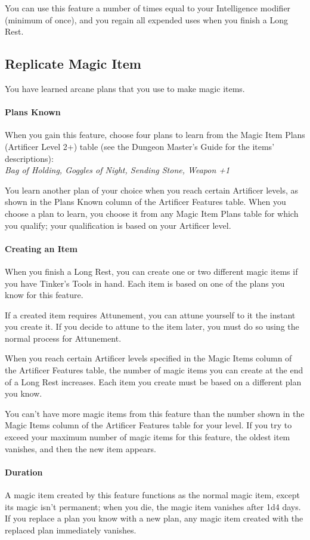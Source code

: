 \documentclass[letterpaper,openany,oneside,twocolumn]{book}
\begin{document}
You can use this feature a number of times equal to your Intelligence modifier (minimum of once), and you regain all expended uses when you finish a Long Rest.
\subsection*{Replicate Magic Item}
You have learned arcane plans that you use to make magic items.
\paragraph*{Plans Known} When you gain this feature, choose four plans to learn from the Magic Item Plans (Artificer Level 2+) table (see the Dungeon Master's Guide for the items' descriptions):\\
\textit{Bag of Holding, Goggles of Night, Sending Stone, Weapon +1}

You learn another plan of your choice when you reach certain Artificer levels, as shown in the Plans Known column of the Artificer Features table. When you choose a plan to learn, you choose it from any Magic Item Plans table for which you qualify; your qualification is based on your Artificer level.
\paragraph*{Creating an Item} When you finish a Long Rest, you can create one or two different magic items if you have Tinker's Tools in hand. Each item is based on one of the plans you know for this feature.

If a created item requires Attunement, you can attune yourself to it the instant you create it. If you decide to attune to the item later, you must do so using the normal process for Attunement.

When you reach certain Artificer levels specified in the Magic Items column of the Artificer Features table, the number of magic items you can create at the end of a Long Rest increases. Each item you create must be based on a different plan you know.

You can't have more magic items from this feature than the number shown in the Magic Items column of the Artificer Features table for your level. If you try to exceed your maximum number of magic items for this feature, the oldest item vanishes, and then the new item appears.
\paragraph*{Duration} A magic item created by this feature functions as the normal magic item, except its magic isn't permanent; when you die, the magic item vanishes after 1d4 days. If you replace a plan you know with a new plan, any magic item created with the replaced plan immediately vanishes.
\end{document}
